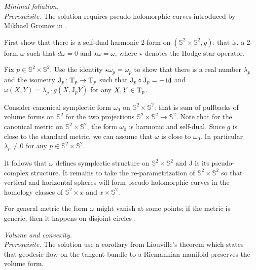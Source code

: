 \textit{Minimal foliation.}\\
\textit{Prerequisite.}
The solution requires pseudo-holomorphic curves 
 introduced by Mikhael Gromov in \cite{gromov-pseudoholomorphic}.

First show that there is a self-dual harmonic 2-form on $(\mathbb{S}^2\times\mathbb{S}^2,g)$;
that is, a 2-form $\omega$ such that $d\omega=0$ and $\star\omega=\omega$,
where $\star$ denotes the Hodge star operator.

Fix $p\in \mathbb{S}^2\times\mathbb{S}^2$.
Use the identity $\star\omega_p=\omega_p$
to show that
there is a real number $\lambda_p$ and the isometry $\mathrm{J}_p\colon\mathrm{T}_p\to\mathrm{T}_p$ 
such that
$\mathrm{J}_p\circ\mathrm{J}_p =-\operatorname{\rm id}$ 
and 
$\omega(X,Y)=\lambda_p\cdot g(X,\mathrm{J}_pY)$ for any $X,Y\in \mathrm{T}_p$.

Consider canonical symplectic form $\omega_0$ on $\mathbb{S}^2\times\mathbb{S}^2$;
that is sum of pullbacks of volume forms on $\mathbb{S}^2$  
for the two projections $\mathbb{S}^2\times\mathbb{S}^2\to \mathbb{S}^2$.
Note that for the canonical metric on $\mathbb{S}^2\times\mathbb{S}^2$,
the form $\omega_0$ is harmonic and self-dual. 
Since $g$ is close to the standard metric,
we can assume that $\omega$ is close to $\omega_0$.
In particular $\lambda_p\ne0$ for any $p\in \mathbb{S}^2\times\mathbb{S}^2$.

It follows that $\omega$ defines symplectic structure on $\mathbb{S}^2\times\mathbb{S}^2$
and $\mathrm{J}$ is its pseudo-complex structure.
It remains to take the re-parametrization of $\mathbb{S}^2\times \mathbb{S}^2$
so that vertical and horizontal spheres will form pseudo-holomorphic curves in the homology classes of $\mathbb{S}^2\times x$ and $x\times \mathbb{S}^2$.
 
For general metric the form $\omega$ might vanish at some points;
if the metric is generic,
then it happens on disjoint circles \cite[see][]{honda}.







\textit{Volume and convexity.}\\
\textit{Prerequisite.}
The solution use a corollary from Liouville's theorem 
which states that geodesic flow on the tangent bundle to a Riemannian manifold preserves the volume form.

